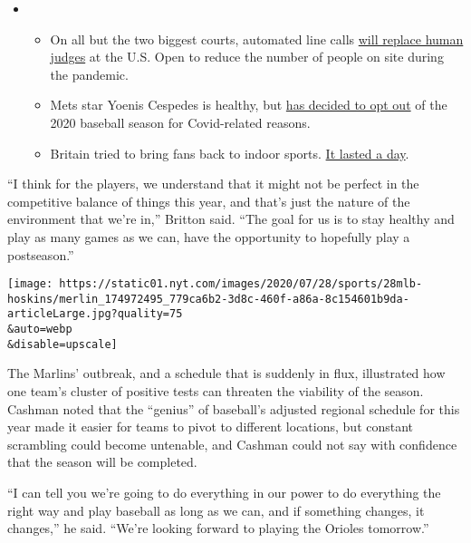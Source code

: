\begin{itemize}
\item
  \begin{itemize}
  \tightlist
  \item
    On all but the two biggest courts, automated line calls
    \href{https://www.nytimes.com/2020/08/03/sports/tennis/us-open-hawkeye-line-judges.html?action=click\&pgtype=Article\&state=default\&region=MAIN_CONTENT_2\&context=storylines_keepup}{will
    replace human judges} at the U.S. Open to reduce the number of
    people on site during the pandemic.
  \item
    Mets star Yoenis Cespedes is healthy, but
    \href{https://www.nytimes.com/2020/08/02/sports/baseball/Yoenis-cespedes-opt-out-rule.html?action=click\&pgtype=Article\&state=default\&region=MAIN_CONTENT_2\&context=storylines_keepup}{has
    decided to opt out} of the 2020 baseball season for Covid-related
    reasons.
  \item
    Britain tried to bring fans back to indoor sports.
    \href{https://www.nytimes.com/2020/08/02/sports/snooker-world-championship.html?action=click\&pgtype=Article\&state=default\&region=MAIN_CONTENT_2\&context=storylines_keepup}{It
    lasted a day}.
  \end{itemize}
\end{itemize}

``I think for the players, we understand that it might not be perfect in
the competitive balance of things this year, and that's just the nature
of the environment that we're in,'' Britton said. ``The goal for us is
to stay healthy and play as many games as we can, have the opportunity
to hopefully play a postseason.''

\texttt{[image: https://static01.nyt.com/images/2020/07/28/sports/28mlb-hoskins/merlin\_174972495\_779ca6b2-3d8c-460f-a86a-8c154601b9da-articleLarge.jpg?quality=75\\\&auto=webp\\\&disable=upscale]}

The Marlins' outbreak, and a schedule that is suddenly in flux,
illustrated how one team's cluster of positive tests can threaten the
viability of the season. Cashman noted that the ``genius'' of baseball's
adjusted regional schedule for this year made it easier for teams to
pivot to different locations, but constant scrambling could become
untenable, and Cashman could not say with confidence that the season
will be completed.

``I can tell you we're going to do everything in our power to do
everything the right way and play baseball as long as we can, and if
something changes, it changes,'' he said. ``We're looking forward to
playing the Orioles tomorrow.''

